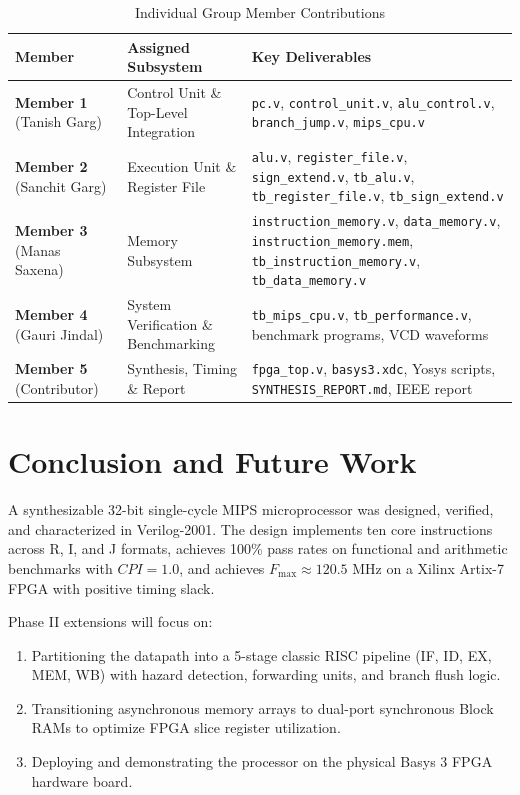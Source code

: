 \documentclass[conference]{IEEEtran}
\begin{document}
\begin{table}[htbp]
\caption{Individual Group Member Contributions}
\label{tab:contributions}
\begin{center}
\begin{tabular}{lp{3.5cm}p{3.2cm}}
\toprule
\textbf{Member} & \textbf{Assigned Subsystem} & \textbf{Key Deliverables} \\
\midrule
\textbf{Member 1} (Tanish Garg) & Control Unit \& Top-Level Integration & \texttt{pc.v}, \texttt{control_unit.v}, \texttt{alu_control.v}, \texttt{branch_jump.v}, \texttt{mips_cpu.v} \\
\midrule
\textbf{Member 2} (Sanchit Garg) & Execution Unit \& Register File & \texttt{alu.v}, \texttt{register_file.v}, \texttt{sign_extend.v}, \texttt{tb_alu.v}, \texttt{tb_register_file.v}, \texttt{tb_sign_extend.v} \\
\midrule
\textbf{Member 3} (Manas Saxena) & Memory Subsystem & \texttt{instruction_memory.v}, \texttt{data_memory.v}, \texttt{instruction_memory.mem}, \texttt{tb_instruction_memory.v}, \texttt{tb_data_memory.v} \\
\midrule
\textbf{Member 4} (Gauri Jindal) & System Verification \& Benchmarking & \texttt{tb_mips_cpu.v}, \texttt{tb_performance.v}, benchmark programs, VCD waveforms \\
\midrule
\textbf{Member 5} (Contributor) & Synthesis, Timing \& Report & \texttt{fpga_top.v}, \texttt{basys3.xdc}, Yosys scripts, \texttt{SYNTHESIS_REPORT.md}, IEEE report \\
\bottomrule
\end{tabular}
\end{center}
\end{table}

\section{Conclusion and Future Work}
A synthesizable 32-bit single-cycle MIPS microprocessor was designed, verified, and characterized in Verilog-2001. The design implements ten core instructions across R, I, and J formats, achieves 100\% pass rates on functional and arithmetic benchmarks with $CPI = 1.0$, and achieves $F_{\max} \approx 120.5\text{ MHz}$ on a Xilinx Artix-7 FPGA with positive timing slack.

Phase II extensions will focus on:
\begin{enumerate}
    \item Partitioning the datapath into a 5-stage classic RISC pipeline (IF, ID, EX, MEM, WB) with hazard detection, forwarding units, and branch flush logic.
    \item Transitioning asynchronous memory arrays to dual-port synchronous Block RAMs to optimize FPGA slice register utilization.
    \item Deploying and demonstrating the processor on the physical Basys 3 FPGA hardware board.
\end{enumerate}
\end{document}
